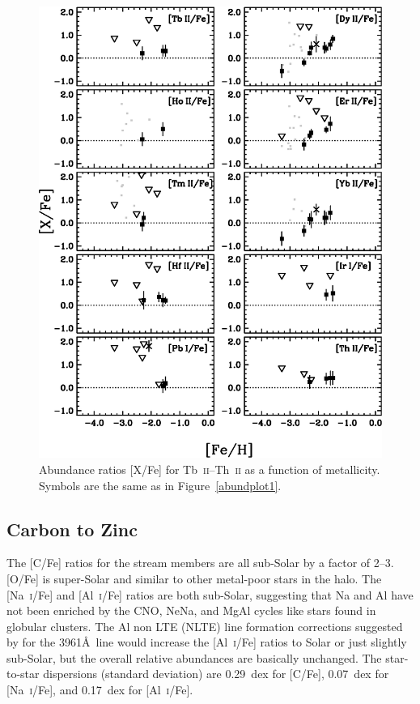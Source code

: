 \documentclass{emulateapj}
\begin{document}
\begin{figure}
\includegraphics[angle=0,width=7.0in]{fig10.eps}
\caption{
\label{abundplot5}
Abundance ratios [X/Fe] for Tb~\textsc{ii}--Th~\textsc{ii}
as a function of metallicity.
Symbols are the same as in Figure~\ref{abundplot1}.
}
\end{figure}




\subsection{Carbon to Zinc}


The [C/Fe] ratios for the stream members are all sub-Solar by
a factor of 2--3.
[O/Fe] is super-Solar and similar to other metal-poor stars in the halo.
The [Na~\textsc{i}/Fe] and [Al~\textsc{i}/Fe] ratios are both sub-Solar,
suggesting that Na and Al have not been enriched by 
the CNO, NeNa, and MgAl cycles
like stars found in globular clusters.
The Al non LTE (NLTE) line formation 
corrections suggested by \citet{andrievsky08}
for the 3961\AA\ line would increase the [Al~\textsc{i}/Fe] ratios
to Solar or just slightly sub-Solar, but the overall
relative abundances are basically unchanged.
The star-to-star dispersions (standard deviation) are 0.29~dex for
[C/Fe], 0.07~dex for [Na~\textsc{i}/Fe], and 0.17~dex
for [Al~\textsc{i}/Fe].
\end{document}
